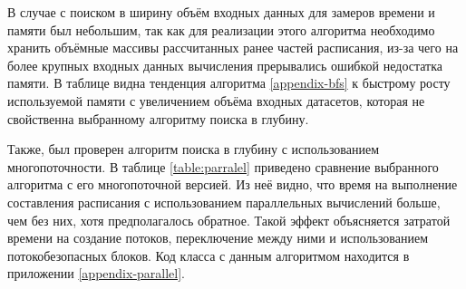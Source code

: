 В случае с поиском в ширину объём входных данных для замеров времени и памяти был небольшим, так как для реализации этого алгоритма необходимо хранить объёмные массивы рассчитанных ранее частей расписания, из-за чего на более крупных входных данных вычисления прерывались ошибкой недостатка памяти. В таблице видна тенденция алгоритма \ref{appendix-bfs} к быстрому росту используемой памяти с увеличением объёма входных датасетов, которая не свойственна выбранному алгоритму поиска в глубину.

Также, был проверен алгоритм поиска в глубину с использованием многопоточности. В таблице \ref{table:parralel} приведено сравнение выбранного алгоритма с его многопоточной версией. Из неё видно, что время на выполнение составления расписания с использованием параллельных вычислений больше, чем без них, хотя предполагалось обратное. Такой эффект объясняется затратой времени на создание потоков, переключение между ними и использованием потокобезопасных блоков. Код класса с данным алгоритмом находится в приложении \ref{appendix-parallel}.

